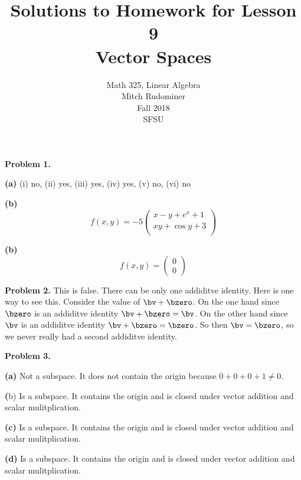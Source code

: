 \documentclass[oneside,12pt]{amsart}
\begin{document}
\title{Solutions to Homework for Lesson 9 \\ Vector Spaces}
\author{Math 325, Linear Algebra \\ Mitch Rudominer \\ Fall 2018 \\ SFSU }
\date{}

\maketitle


\textbf{Problem 1.}

\smallskip

\textbf{(a)} (i) no, (ii) yes, (iii) yes, (iv) yes, (v) no, (vi) no

\smallskip

\textbf{(b)}
$$f(x,y) =
-5
\begin{pmatrix}
x - y + e^x  + 1 \\
xy + \cos y + 3 \\
\end{pmatrix}
$$

\smallskip

\textbf{(b)}
$$f(x,y) =
\begin{pmatrix}
0 \\ 0
\end{pmatrix}
$$


\textbf{Problem 2.}  This is false. There can be only one addiditve identity. Here
is one way to see this. Consider the value of $\bv + \bzero$. On the one
hand since $\bzero$ is an addiditve identity $\bv + \bzero = \bv$.
On the other hand since $\bv$ is an addiditve identity $\bv + \bzero = \bzero$.
So then $\bv=\bzero$, so we never really had a second addiditve identity.

\medskip

\textbf{Problem 3.}

\smallskip

\textbf{(a)} Not a subspace. It does not contain the origin because
$0+0+0+1\not=0$.

\smallskip

\textbf({b}) Is a subspace. It contains the origin and is closed under
vector addition and scalar mulitplication.

\smallskip

\textbf{(c)} Is a subspace. It contains the origin and is closed under
vector addition and scalar mulitplication.

\smallskip

\textbf{(d)} Is a subspace. It contains the origin and is closed under
vector addition and scalar mulitplication.
\end{document}
